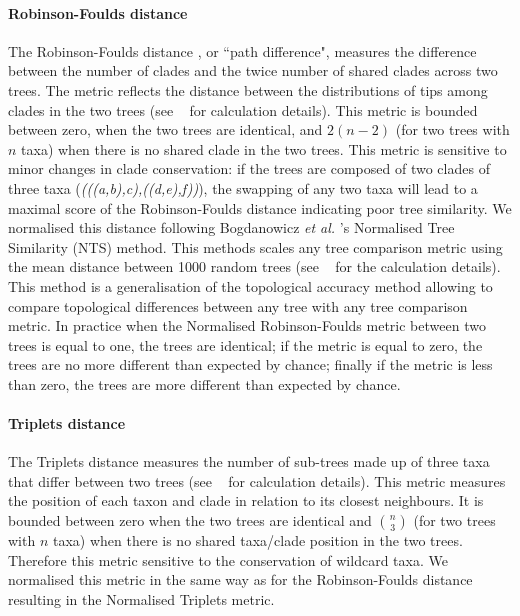 \documentclass[10pt,letterpaper]{article}
\begin{document}
\paragraph*{Robinson-Foulds distance}
The Robinson-Foulds distance \cite{RF1981}, or ``path difference", measures the difference between the number of clades and the twice number of shared clades across two trees. The metric reflects the distance between the distributions of tips among clades in the two trees \cite{RF1981} (see ~ for calculation details). This metric is bounded between zero, when the two trees are identical, and $2(n-2)$ (for two trees with $n$ taxa) when there is no shared clade in the two trees. This metric is sensitive to minor changes in clade conservation: if the trees are composed of two clades of three taxa (\textit{(((a,b),c),((d,e),f))}), the swapping of any two taxa will lead to a maximal score of the Robinson-Foulds distance indicating poor tree similarity. We normalised this distance following Bogdanowicz \textit{et al.} \cite{Bogdanowicz2012}'s Normalised Tree Similarity (NTS) method. This methods scales %
any tree comparison metric using the mean distance between 1000 random trees (see ~ for the calculation details). This method is a generalisation of the topological accuracy method \cite{Price2010} allowing to compare topological differences between any tree with any tree comparison metric. In practice when the Normalised Robinson-Foulds metric between two trees is equal to one, the trees are identical; if the metric is equal to zero, the trees are no more different than expected by chance; finally if the metric is less than zero, the trees are more different than expected by chance.

\paragraph*{Triplets distance}
The Triplets distance \cite{dobson1975triplets} measures the number of sub-trees made up of three taxa that differ between two trees \cite{critchlowthe1996} (see ~ for calculation details). This metric measures the position of each taxon and clade in relation to its closest neighbours. It is bounded between zero when the two trees are identical and $\binom{n}{3}$ (for two trees with $n$ taxa) when there is no shared taxa/clade position in the two trees. Therefore this metric sensitive to the conservation of wildcard taxa. We normalised this metric in the same way as for the Robinson-Foulds distance resulting in the Normalised Triplets metric.
\end{document}
